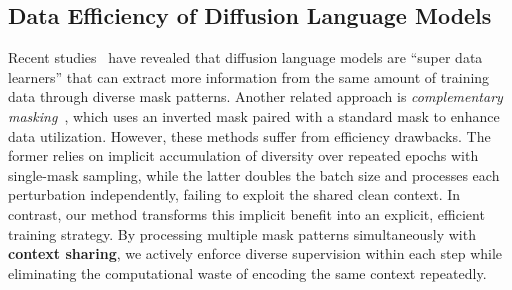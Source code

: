 \subsection{Data Efficiency of Diffusion Language Models}
Recent studies~\citep{prabhudesaidiffusion,ni2025diffusion,ni2025training} have revealed that diffusion language models are ``super data learners'' that can extract more information from the same amount of training data through diverse mask patterns.
Another related approach is \emph{complementary masking}~\citep{fastdllmv2}, which uses an inverted mask paired with a standard mask to enhance data utilization.
However, these methods suffer from efficiency drawbacks.
The former relies on implicit accumulation of diversity over repeated epochs with single-mask sampling,
while the latter doubles the batch size and processes each perturbation independently, failing to exploit the shared clean context.
In contrast, our method transforms this implicit benefit into an explicit, efficient training strategy.
By processing multiple mask patterns simultaneously with \textbf{context sharing}, we actively enforce diverse supervision within each step while eliminating the computational waste of encoding the same context repeatedly.
